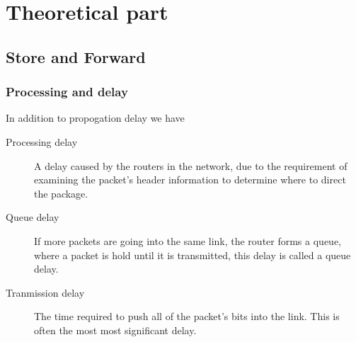 \documentclass[a4paper]{article}
\begin{document}
\maketitle
\thispagestyle{first}
\newpage

\section{Theoretical part}
\subsection{Store and Forward}
\subsubsection{Processing and delay}
In addition to propogation delay we have

\begin{description}
    \item[Processing delay] A delay caused by the routers in the network,
        due to the requirement of examining the packet's header information to
        determine where to direct the package.
    \item[Queue delay] If more packets are going into the same link, the
        router forms a queue, where a packet is hold until it is
        transmitted, this delay is called a queue delay.
    \item[Tranmission delay] The time required to push all of the packet's bits
        into the link. This is often the most most significant delay.
\end{description}

\end{document}
